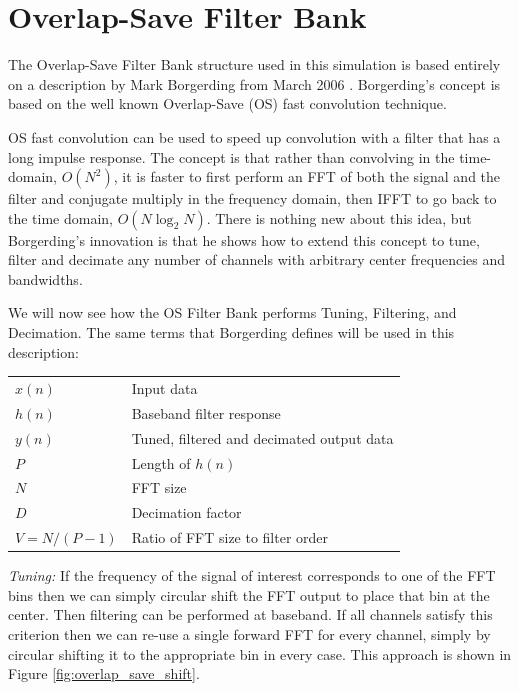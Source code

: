 \documentclass[12pt]{article}
\begin{document}
\section{Overlap-Save Filter Bank}
\label{sec:os_filter_bank}
The Overlap-Save Filter Bank structure used in this simulation is based
entirely on a description by Mark Borgerding from March 2006
\cite{Borgerding1}.  Borgerding's concept is based on the well known
Overlap-Save (OS) fast convolution technique.

OS fast convolution can be used to speed up convolution with
a filter that has a long impulse response. The concept is that rather than
convolving in the time-domain, $O(N^2)$, it is faster to first
perform an FFT of both the signal and the filter and conjugate multiply in the
frequency domain, then IFFT to go back to the time domain, $O(N\log_2N)$.
There is nothing new about this idea, but Borgerding's innovation is that he
shows how to extend this concept to tune, filter and decimate any number of
channels with arbitrary center frequencies and bandwidths.

We will now see how the OS Filter Bank performs Tuning, Filtering, and
Decimation. The same terms that Borgerding defines will be used in this
description:

\begin{center}
\begin{tabular}{ll}
    $x(n)$        & Input data \\
    $h(n)$        & Baseband filter response \\
    $y(n)$        & Tuned, filtered and decimated output data \\
    $P$           & Length of $h(n)$ \\
    $N$           & FFT size \\
    $D$           & Decimation factor \\
    $V = N/(P-1)$ & Ratio of FFT size to filter order \\
\end{tabular}
\end{center}

\emph{Tuning:} If the frequency of the signal of interest corresponds to one of
the FFT bins then we can simply circular shift the FFT output to place that bin
at the center. Then filtering can be performed at baseband.  If all channels
satisfy this criterion then we can re-use a single forward FFT for every
channel, simply by circular shifting it to the appropriate bin in every case. 
This approach is shown in Figure \ref{fig:overlap_save_shift}.
\end{document}
